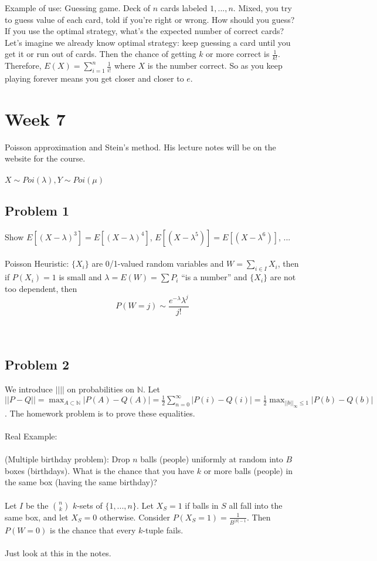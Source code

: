 \documentclass[12pt]{article}
\begin{document}
Example of use: Guessing game.  Deck of $n$ cards labeled $1, ..., n $.  Mixed, you try to guess value of each card, told if you're right or wrong.  How should you guess?  If you use the optimal strategy, what's the expected number of correct cards?  Let's imagine we already know optimal strategy: keep guessing a card until you get it or run out of cards.  Then the chance of getting $k$ or more correct is $\frac{1}{k!}$.  Therefore, $E(X) = \sum_{i=1}^n \frac{1}{i!}$ where $X$ is the number correct.  So as you keep playing forever means you get closer and closer to $e$.

\section{Week 7}
Poisson approximation and Stein's method.  His lecture notes will be on the website for the course.
\\ \\
$X \sim Poi(\lambda), Y \sim Poi(\mu)$
\subsection{Problem 1}
Show $E[(X - \lambda)^3] = E[(X - \lambda)^4]$, $E[(X - \lambda^5)] = E[(X - \lambda^6)]$, ...
\\ \\
Poisson Heuristic: $\{X_i\}$ are 0/1-valued random variables and $W = \sum_{i \in I} X_i$, then if $P(X_i) = 1$ is small and $\lambda = E(W) = \sum P_i$ ``is a number'' and $\{X_i\}$ are not too dependent, then
$$P(W = j) \sim \frac{e^{-\lambda} \lambda^j}{j!}$$
\\ \\
\subsection{Problem 2}
We introduce $|| ||$ on probabilities on $\mathbb{N}$.  Let $||P - Q || = \max_{A \subset \mathbb{N}} | P(A) - Q(A) | = \frac{1}{2} \sum_{n=0}^\infty |P(i) - Q(i)| = \frac{1}{2} \max_{||b||_\infty \le 1} |P(b) - Q(b)|$.  The homework problem is to prove these equalities.
\\ \\
Real Example:
\\ \\
(Multiple birthday problem): Drop $n$ balls (people) uniformly at random into $B$ boxes (birthdays).  What is the chance that you have $k$ or more balls (people) in the same box (having the same birthday)?
\\ \\
Let $I$ be the $n \choose k$ $k$-sets of $\{1, ..., n\}$.  Let $X_S = 1$ if balls in $S$ all fall into the same box, and let $X_S = 0$ otherwise.  Consider $P(X_S = 1) = \frac{1}{B^{|S| - 1}}$.  Then $P(W = 0)$ is the chance that every $k$-tuple fails.
\\ \\
Just look at this in the notes.
\end{document}
